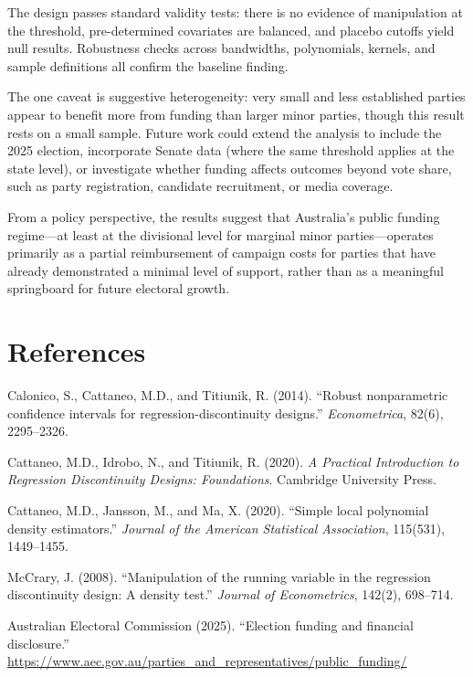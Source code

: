 \documentclass[12pt, a4paper]{article}
\begin{document}
The design passes standard validity tests: there is no evidence of manipulation at the threshold, pre-determined covariates are balanced, and placebo cutoffs yield null results. Robustness checks across bandwidths, polynomials, kernels, and sample definitions all confirm the baseline finding.

The one caveat is suggestive heterogeneity: very small and less established parties appear to benefit more from funding than larger minor parties, though this result rests on a small sample. Future work could extend the analysis to include the 2025 election, incorporate Senate data (where the same threshold applies at the state level), or investigate whether funding affects outcomes beyond vote share, such as party registration, candidate recruitment, or media coverage.

From a policy perspective, the results suggest that Australia's public funding regime---at least at the divisional level for marginal minor parties---operates primarily as a partial reimbursement of campaign costs for parties that have already demonstrated a minimal level of support, rather than as a meaningful springboard for future electoral growth.


\newpage
\section*{References}

\begin{description}
    \item Calonico, S., Cattaneo, M.D., and Titiunik, R. (2014). ``Robust nonparametric confidence intervals for regression-discontinuity designs.'' \textit{Econometrica}, 82(6), 2295--2326.

    \item Cattaneo, M.D., Idrobo, N., and Titiunik, R. (2020). \textit{A Practical Introduction to Regression Discontinuity Designs: Foundations}. Cambridge University Press.

    \item Cattaneo, M.D., Jansson, M., and Ma, X. (2020). ``Simple local polynomial density estimators.'' \textit{Journal of the American Statistical Association}, 115(531), 1449--1455.

    \item McCrary, J. (2008). ``Manipulation of the running variable in the regression discontinuity design: A density test.'' \textit{Journal of Econometrics}, 142(2), 698--714.

    \item Australian Electoral Commission (2025). ``Election funding and financial disclosure.'' \url{https://www.aec.gov.au/parties_and_representatives/public_funding/}
\end{description}
\end{document}
